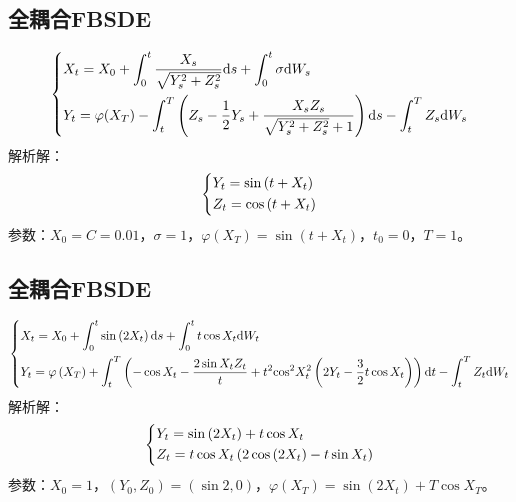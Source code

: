 	\subsection{全耦合FBSDE}
	\begin{equation*}
	\centering
	\left\{\begin{lgathered}
	{{X_t} = {X_0} + \int_0^t {\frac{{{X_s}}}{{\sqrt {Y_s^2 + Z_s^2} }}\mathrm{d}s}  + \int_0^t {\sigma \mathrm{d}{W_s}} }\\
	{{Y_t} = \varphi ( {{X_T}} ) - \int_t^T {\left( {{Z_s} - \frac{1}{2}{Y_s} + \frac{{{X_s}{Z_s}}}{{\sqrt {Y_s^2 + Z_s^2}  + 1}}} \right)\mathrm{d}s}  - \int_t^T {{Z_s}\mathrm{d}{W_s}} }
	\end{lgathered} \right.
	\end{equation*}
	解析解：
	\begin{equation*}
	\centering
	\left\{\begin{lgathered}
	{{Y_t} = \sin \left( {t + {X_t}} \right)}\\
	{{Z_t} = \cos \left( {t + {X_t}} \right)}
	\end{lgathered} \right.
	\end{equation*}
	参数：$X_0=C=0.01$，$\sigma=1$，$\varphi(X_T)=\sin \left( {t + {X_t}} \right)$，$t_0=0$，$T=1$。
	\subsection{全耦合FBSDE}
				\begin{equation*}
				\centering
				\left\{\begin{lgathered}
			{{X_t} = {X_0} + \int_0^t {\sin \left( {2{X_t}} \right)\mathrm{d}s}  + \int_0^t {t\cos {X_t}\mathrm{d}{W_t}} }\\
			{{Y_t} = \varphi \left( {{X_T}} \right) + \int_t^T {\left( { - \cos {X_t} - \frac{{2\sin {X_t}{Z_t}}}{t} + {t^2}{{\cos }^2}X_t^2  \left( {2{Y_t} - \frac{3}{2}t\cos {X_t}} \right)} \right)\mathrm{d}t}  - \int_t^T {{Z_t}\mathrm{d}{W_t}} }
				\end{lgathered} \right.
				\end{equation*}
	解析解：
				\begin{equation*}
				\centering
				\left\{\begin{lgathered}
				{{Y_t} = \sin \left( {2{X_t}} \right) + t\cos {X_t}}\\
				{{Z_t} = t\cos {X_t}\left( {2\cos \left( {2{X_t}} \right) - t\sin {X_t}} \right)}
				\end{lgathered} \right.
				\end{equation*}
	参数：$X_0=1$，$(Y_0,Z_0)=(\sin2,0)$，$\varphi(X_T)=\sin \left( {2{X_t}} \right)+T\cos{X_T}$。

